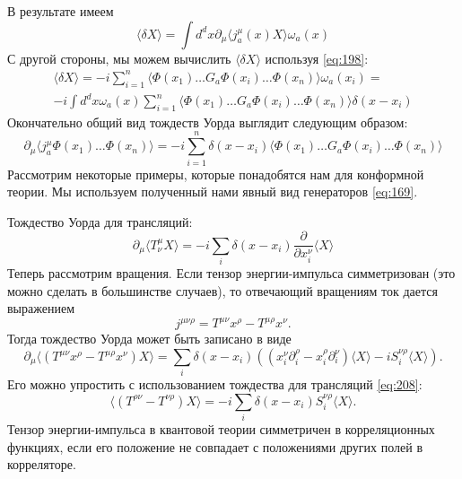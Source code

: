 \documentclass[a4paper,12pt]{article}
\theoremstyle{definition}
\theoremstyle{definition}
\theoremstyle{definition}
\begin{document}
В результате имеем
\begin{equation}
  \label{eq:205}
  \langle \delta X\rangle=\int d^{d}x \partial_{\mu}\langle j^{\mu}_{a}(x) X\rangle \omega_{a}(x)
\end{equation}
С другой стороны, мы можем вычислить $\langle\delta X\rangle$ используя \eqref{eq:198}:
\begin{multline}
  \label{eq:206}
  \langle\delta X\rangle=-i\sum_{i=1}^{n}\langle \Phi(x_{1})\dots G_{a} \Phi(x_{i}) \dots \Phi(x_{n})\rangle \omega_{a}(x_{i})=\\
  -i \int d^{d}x \omega_{a}(x) \sum_{i=1}^{n} \langle \Phi(x_{1}) \dots G_{a} \Phi(x_{i}) \dots \Phi(x_{n})\rangle \delta (x-x_{i})
\end{multline}
Окончательно общий вид тождеств Уорда выглядит следующим образом:
\begin{equation}
  \label{eq:207}
  \partial_{\mu}\langle j^{\mu}_{a}\Phi(x_{1}) \dots \Phi(x_{n})\rangle=-i\sum_{i=1}^{n}\delta (x-x_{i}) \langle\Phi(x_{1})\dots G_{a} \Phi(x_{i})\dots \Phi(x_{n})\rangle
\end{equation}
Рассмотрим некоторые примеры, которые понадобятся нам для конформной теории. Мы используем
полученный нами явный вид генераторов \eqref{eq:169}. 

Тождество Уорда для трансляций:
\begin{equation}
  \label{eq:208}
  \partial_{\mu}\langle T^{\mu}_{\nu} X\rangle =-i \sum_{i} \delta(x-x_{i}) \frac{\partial}{\partial x_{i}^{\nu}} \langle X \rangle
\end{equation}
Теперь рассмотрим вращения. Если тензор энергии-импульса симметризован (это можно сделать в
большинстве случаев), то отвечающий вращениям ток дается выражением 
\begin{equation}
  \label{eq:209}
  j^{\mu\nu\rho}=T^{\mu\nu}x^{\rho}-T^{\mu\rho}x^{\nu}.
\end{equation}
Тогда тождество Уорда может быть записано в виде
\begin{equation}
  \label{eq:210}
  \partial_{\mu}\langle (T^{\mu\nu}x^{\rho}-T^{\mu\rho}x^{\nu}) X\rangle=\sum_{i }\delta(x-x_{i}) \left( (x^{\nu}_{i}\partial^{\rho}_{i}-x^{\rho}_{i}\partial^{\nu}_{i})\langle X\rangle-i S^{\nu\rho}_{i}\langle X\rangle\right).
\end{equation}
Его можно упростить с использованием тождества для трансляций \eqref{eq:208}:
\begin{equation}
  \label{eq:211}
  \langle (T^{\rho\nu}-T^{\nu\rho}) X\rangle=-i \sum_{i} \delta(x-x_{i}) S^{\nu\rho}_{i}\langle X\rangle.
\end{equation}
Тензор энергии-импульса в квантовой теории симметричен в корреляционных функциях, если его положение
не совпадает с положениями других полей в корреляторе.  
\end{document}

